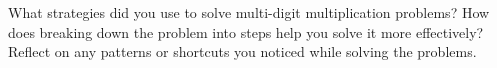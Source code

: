 \documentclass[12pt]{article}
\begin{document}
\vspace{1em}

\begin{tcolorbox}[colframe=black!60, colback=white, 
coltitle=black, colbacktitle=black!15, fonttitle=\bfseries\Large, 
title=Reflection, halign title=center, left=10pt, right=10pt, top=10pt, bottom=80pt]
What strategies did you use to solve multi-digit multiplication problems? How does breaking down the problem into steps help you solve it more effectively? Reflect on any patterns or shortcuts you noticed while solving the problems.
\vspace{2cm}
\end{tcolorbox}
\end{document}
